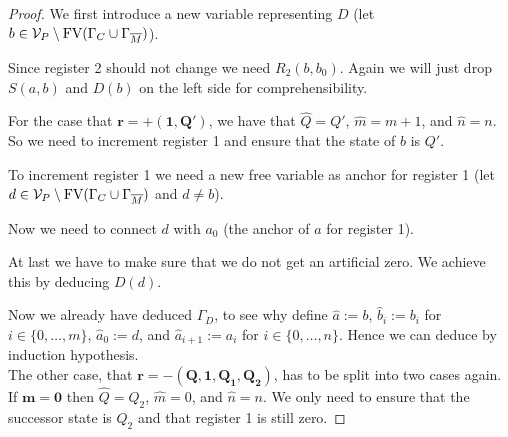 \begin{proof}
	We first introduce a new variable representing $D$ (let $b\in \mathcal{V}_P\setminus\text{FV}(\Gamma_C\cup\Gamma_{\overline{M}})$).
	
	\begin{figure}[H]
		\centering
		
	\end{figure}
	Since register 2 should not change we need $R_2(b,b_0)$. Again we will just drop $S(a,b)$ and $D(b)$ on the left side for comprehensibility.
		
	\begin{figure}[H]
		\centering
		
	\end{figure}
	
	For the case that $\boldsymbol{r=+(1,Q')}$, we have that $\widehat{Q}=Q'$, $\widehat{m}=m+1$, and $\widehat{n}=n$. So we need to increment register 1 and ensure that the state of $b$ is $Q'$.
	\begin{figure}[H]
		\centering
		
	\end{figure}
	
	To increment register 1 we need a new free variable as anchor for register 1 (let $d\in\mathcal{V}_P\setminus\text{FV}(\Gamma_C\cup\Gamma_{\overline{M}})$ and $d\neq b$).
	
	\begin{figure}[H]
		\centering
		
	\end{figure}
	
	Now we need to connect $d$ with $a_0$ (the anchor of $a$ for register 1).
	
	\begin{figure}[H]
		\centering
		
	\end{figure}
	
	At last we have to make sure that we do not get an artificial zero. We achieve this by deducing $D(d)$.
	
	\begin{figure}[H]
		\centering
		
	\end{figure}
	
	Now we already have deduced $\Gamma_D$, to see why define $\widehat{a}:=b$, $\widehat{b}_i:=b_i$ for $i\in\{0,\dots,m\}$, $\widehat{a}_0:=d$, and $\widehat{a}_{i+1}:=a_i$ for $i\in\{0,\dots,n\}$.
	Hence we can deduce \false{} by induction hypothesis.\\
	
	The other case, that $\boldsymbol{r=-(Q,1,Q_1,Q_2)}$, has to be split into two cases again. If $\boldsymbol{m=0}$ then $\widehat{Q}=Q_2$, $\widehat{m}=0$, and $\widehat{n}=n$. We only need to ensure that the successor state is $Q_2$ and that register 1 is still zero.
	

\end{proof}
